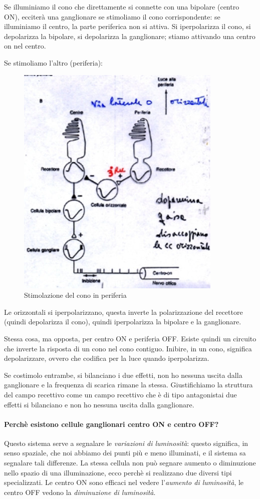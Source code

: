 \documentclass[a4paper,12pt]{article}
\begin{document}
Se illuminiamo il cono che direttamente si connette con una bipolare (centro ON), ecciterà una ganglionare se stimoliamo il cono corrispondente: se illuminiamo il centro, la parte periferica non si attiva. Si iperpolarizza il cono, si depolarizza la bipolare, si depolarizza la ganglionare; stiamo attivando una centro on nel centro.

Se stimoliamo l'altro (periferia):
\begin{figure}[H]
\centering
\includegraphics[scale=0.4]{immagine/B.jpg}
\caption{Stimolazione del cono in periferia}
\end{figure} 

Le orizzontali si iperpolarizzano, questa inverte la polarizzazione del recettore (quindi depolarizza il cono), quindi iperpolarizza la bipolare e la ganglionare. 

Stessa cosa, ma opposta, per centro ON e periferia OFF. Esiste quindi un circuito che inverte la risposta di un cono nel cono contiguo. Inibire, in un cono, significa depolarizzare, ovvero che codifica per la luce quando iperpolarizza. 

Se costimolo entrambe, si bilanciano i due effetti, non ho nessuna uscita dalla ganglionare e la frequenza di scarica rimane la stessa. Giustifichiamo la struttura del campo recettivo come un campo recettivo che è di tipo antagonistai due effetti si bilanciano e non ho nessuna uscita dalla ganglionare.

\paragraph{Perchè esistono cellule ganglionari centro ON e centro OFF?} Questo sistema serve a segnalare le \emph{variazioni di luminosità}: questo significa, in senso spaziale, che noi abbiamo dei punti più e meno illuminati, e il sistema sa segnalare tali differenze. La stessa cellula non può segnare aumento o diminuzione nello spazio di una illuminazione, ecco perchè si realizzano due diversi tipi specializzati. Le centro ON sono efficaci nel vedere l'\emph{aumento di luminosità}, le centro OFF vedono la \emph{diminuzione di luminosità}.
\end{document}

